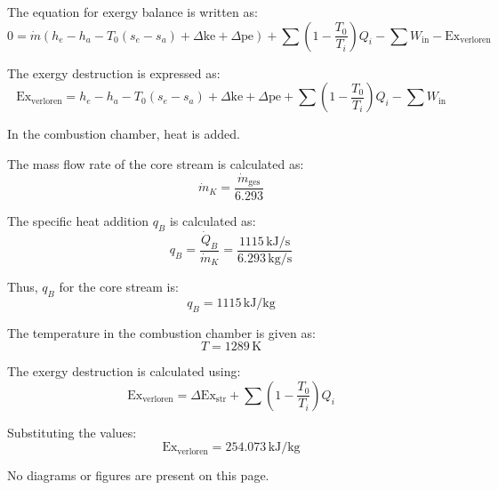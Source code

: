 The equation for exergy balance is written as:  
\[
0 = \dot{m} (h_e - h_a - T_0 (s_e - s_a) + \Delta \text{ke} + \Delta \text{pe}) + \sum \left( 1 - \frac{T_0}{T_i} \right) Q_i - \sum W_{\text{in}} - \text{Ex}_{\text{verloren}}
\]  

The exergy destruction is expressed as:  
\[
\text{Ex}_{\text{verloren}} = h_e - h_a - T_0 (s_e - s_a) + \Delta \text{ke} + \Delta \text{pe} + \sum \left( 1 - \frac{T_0}{T_i} \right) Q_i - \sum W_{\text{in}}
\]  

In the combustion chamber, heat is added.  

The mass flow rate of the core stream is calculated as:  
\[
\dot{m}_K = \frac{\dot{m}_{\text{ges}}}{6.293}
\]  

The specific heat addition \( q_B \) is calculated as:  
\[
q_B = \frac{\dot{Q}_B}{\dot{m}_K} = \frac{1115 \, \text{kJ/s}}{6.293 \, \text{kg/s}}
\]  

Thus, \( q_B \) for the core stream is:  
\[
q_B = 1115 \, \text{kJ/kg}
\]  

The temperature in the combustion chamber is given as:  
\[
T = 1289 \, \text{K}
\]  

The exergy destruction is calculated using:  
\[
\text{Ex}_{\text{verloren}} = \Delta \text{Ex}_{\text{str}} + \sum \left( 1 - \frac{T_0}{T_i} \right) Q_i
\]  

Substituting the values:  
\[
\text{Ex}_{\text{verloren}} = 254.073 \, \text{kJ/kg}
\]  

No diagrams or figures are present on this page.